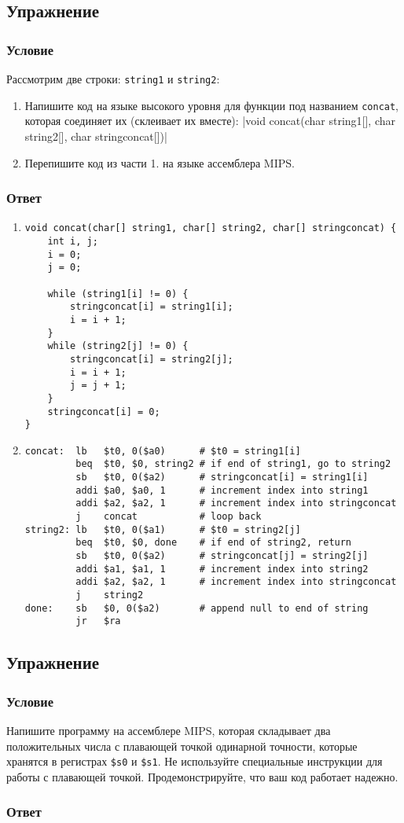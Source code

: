 \documentclass[12pt]{article}
\newenvironment{e}[1][dummy label]{
    \subsection{Упражнение}\label{#1}
    \subsubsection*{Условие}
    }{
    \subsubsection*{Ответ}
}
\begin{document}
    \begin{e}
        Рассмотрим две строки: \texttt{string1} и \texttt{string2}:
        \begin{enumerate}
            \item Напишите код на языке высокого уровня для функции под названием \texttt{concat}, которая соединяет их (склеивает их вместе): |void concat(char string1[], char string2[], char stringconcat[])|
            \item Перепишите код из части 1. на языке ассемблера MIPS.
        \end{enumerate}
    \end{e}
    \begin{enumerate}
        \item
        \begin{verbatim}
void concat(char[] string1, char[] string2, char[] stringconcat) {
    int i, j;
    i = 0;
    j = 0;

    while (string1[i] != 0) {
        stringconcat[i] = string1[i];
        i = i + 1;
    }
    while (string2[j] != 0) {
        stringconcat[i] = string2[j];
        i = i + 1;
        j = j + 1;
    }
    stringconcat[i] = 0;
}
        \end{verbatim}
        \item
        \begin{verbatim}
concat:  lb   $t0, 0($a0)      # $t0 = string1[i]
         beq  $t0, $0, string2 # if end of string1, go to string2
         sb   $t0, 0($a2)      # stringconcat[i] = string1[i]
         addi $a0, $a0, 1      # increment index into string1
         addi $a2, $a2, 1      # increment index into stringconcat
         j    concat           # loop back
string2: lb   $t0, 0($a1)      # $t0 = string2[j]
         beq  $t0, $0, done    # if end of string2, return
         sb   $t0, 0($a2)      # stringconcat[j] = string2[j]
         addi $a1, $a1, 1      # increment index into string2
         addi $a2, $a2, 1      # increment index into stringconcat
         j    string2
done:    sb   $0, 0($a2)       # append null to end of string
         jr   $ra
        \end{verbatim}

    \end{enumerate}

    \newpage

    \begin{e}
        Напишите программу на ассемблере MIPS, которая складывает два положительных числа с плавающей точкой одинарной точности, которые хранятся в регистрах \texttt{\$s0} и \texttt{\$s1}. Не используйте специальные инструкции для работы с плавающей точкой. Продемонстрируйте, что ваш код работает надежно.
    \end{e}
\end{document}
